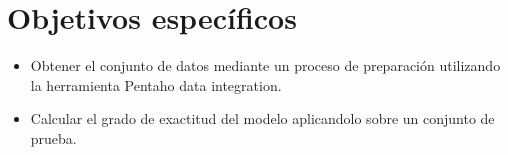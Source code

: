\section{Objetivos espec\'ificos}
\begin{itemize}
    \item Obtener el conjunto de datos mediante un proceso de preparaci\'on  utilizando la herramienta
    Pentaho data integration.
    \item Calcular el grado de exactitud del modelo aplicandolo sobre un conjunto de prueba.
\end{itemize}

